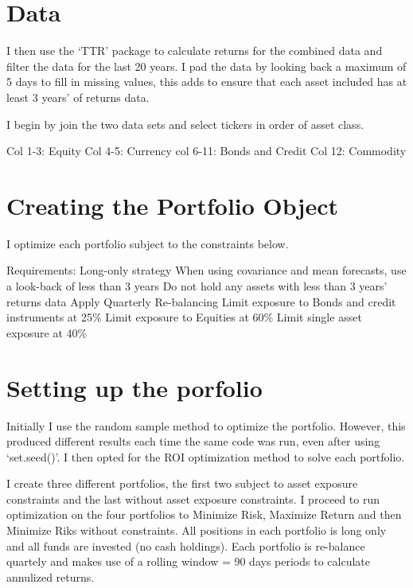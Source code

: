 \documentclass[
]{article}
\begin{document}
\hypertarget{data}{%
\section{Data}\label{data}}

I then use the `TTR' package to calculate returns for the combined data
and filter the data for the last 20 years. I pad the data by looking
back a maximum of 5 days to fill in missing values, this adds to ensure
that each asset included has at least 3 years' of returns data.

I begin by join the two data sets and select tickers in order of asset
class.

Col 1-3: Equity Col 4-5: Currency col 6-11: Bonds and Credit Col 12:
Commodity

\hypertarget{creating-the-portfolio-object}{%
\section{Creating the Portfolio
Object}\label{creating-the-portfolio-object}}

I optimize each portfolio subject to the constraints below.

Requirements: Long-only strategy When using covariance and mean
forecasts, use a look-back of less than 3 years Do not hold any assets
with less than 3 years' returns data Apply Quarterly Re-balancing Limit
exposure to Bonds and credit instruments at 25\% Limit exposure to
Equities at 60\% Limit single asset exposure at 40\%

\hypertarget{setting-up-the-porfolio}{%
\section{Setting up the porfolio}\label{setting-up-the-porfolio}}

Initially I use the random sample method to optimize the portfolio.
However, this produced different results each time the same code was
run, even after using `set.seed()'. I then opted for the ROI
optimization method to solve each portfolio.

I create three different portfolios, the first two subject to asset
exposure constraints and the last without asset exposure constraints. I
proceed to run optimization on the four portfolios to Minimize Risk,
Maximize Return and then Minimize Riks without constraints. All
positions in each portfolio is long only and all funds are invested (no
cash holdings). Each portfolio is re-balance quartely and makes use of a
rolling window = 90 days periods to calculate annulized returns.
\end{document}
